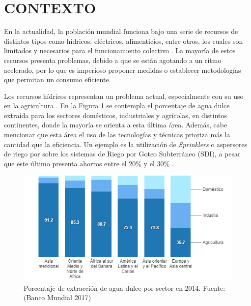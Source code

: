 \documentclass[12pt,a4paper]{article}
\begin{document}
\tableofcontents	%

\pagebreak

\listoftables		 %

\pagebreak

\listoffigures		%

\pagebreak









\printindex










\section{CONTEXTO}

En la actualidad, la población mundial funciona bajo una serie de recursos de distintos tipos como hídricos, eléctricos, alimenticios, entre otros, los cuales son limitados y necesarios para el funcionamiento colectivo \parencite{FAO2018}. La mayoría de estos recursos presenta problemas, debido a que se están agotando a un ritmo acelerado, por lo que es imperioso proponer medidas o establecer metodologías que permitan un consumo eficiente. 

Los recursos hídricos representan un problema actual, especialmente con su uso en la agricultura \parencite{Specht2014}. En la Figura \ref{fig:agua_dulce_sector} se contempla el porcentaje de agua dulce extraída para los sectores domésticos, industriales y agrícolas, en distintos continentes, donde la mayoría se orienta a esta última área. Además, cabe mencionar que esta área el uso de las tecnologías y técnicas prioriza más la cantidad que la eficiencia. Un ejemplo es la utilización de \textit{Sprinklers} o aspersores de riego por sobre los sistemas de Riego por Goteo Subterráneo (SDI), a pesar que este último presenta ahorros entre el 20\% y el 30\% \parencite{Zaccaria2017}.

   		 
\begin{figure}[h!]
  \centering
    \includegraphics[scale=1]{imagenes/agua_dulce_sector.png}
  \caption{Porcentaje de extracción de agua dulce por sector en 2014. Fuente: (Banco Mundial 2017)}
  \label{fig:agua_dulce_sector}
\end{figure}   	
\end{document}
